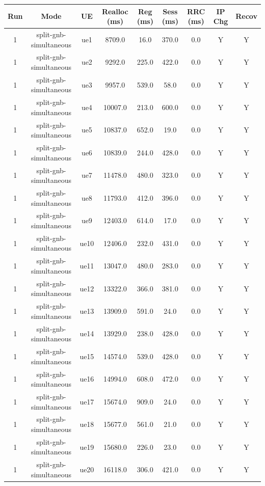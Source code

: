 \begin{table}[ht]
\centering
\begin{tabular}{|c|c|c|c|c|c|c|c|c|}
\hline
Run & Mode & UE & Realloc (ms) & Reg (ms) & Sess (ms) & RRC (ms) & IP Chg & Recov \\
\hline
1 & split-gnb-simultaneous & ue1 & 8709.0 & 16.0 & 370.0 & 0.0 & Y & Y \\
1 & split-gnb-simultaneous & ue2 & 9292.0 & 225.0 & 422.0 & 0.0 & Y & Y \\
1 & split-gnb-simultaneous & ue3 & 9957.0 & 539.0 & 58.0 & 0.0 & Y & Y \\
1 & split-gnb-simultaneous & ue4 & 10007.0 & 213.0 & 600.0 & 0.0 & Y & Y \\
1 & split-gnb-simultaneous & ue5 & 10837.0 & 652.0 & 19.0 & 0.0 & Y & Y \\
1 & split-gnb-simultaneous & ue6 & 10839.0 & 244.0 & 428.0 & 0.0 & Y & Y \\
1 & split-gnb-simultaneous & ue7 & 11478.0 & 480.0 & 323.0 & 0.0 & Y & Y \\
1 & split-gnb-simultaneous & ue8 & 11793.0 & 412.0 & 396.0 & 0.0 & Y & Y \\
1 & split-gnb-simultaneous & ue9 & 12403.0 & 614.0 & 17.0 & 0.0 & Y & Y \\
1 & split-gnb-simultaneous & ue10 & 12406.0 & 232.0 & 431.0 & 0.0 & Y & Y \\
1 & split-gnb-simultaneous & ue11 & 13047.0 & 480.0 & 283.0 & 0.0 & Y & Y \\
1 & split-gnb-simultaneous & ue12 & 13322.0 & 366.0 & 381.0 & 0.0 & Y & Y \\
1 & split-gnb-simultaneous & ue13 & 13909.0 & 591.0 & 24.0 & 0.0 & Y & Y \\
1 & split-gnb-simultaneous & ue14 & 13929.0 & 238.0 & 428.0 & 0.0 & Y & Y \\
1 & split-gnb-simultaneous & ue15 & 14574.0 & 539.0 & 428.0 & 0.0 & Y & Y \\
1 & split-gnb-simultaneous & ue16 & 14994.0 & 608.0 & 472.0 & 0.0 & Y & Y \\
1 & split-gnb-simultaneous & ue17 & 15674.0 & 909.0 & 24.0 & 0.0 & Y & Y \\
1 & split-gnb-simultaneous & ue18 & 15677.0 & 561.0 & 21.0 & 0.0 & Y & Y \\
1 & split-gnb-simultaneous & ue19 & 15680.0 & 226.0 & 23.0 & 0.0 & Y & Y \\
1 & split-gnb-simultaneous & ue20 & 16118.0 & 306.0 & 421.0 & 0.0 & Y & Y \\

\end{tabular}
\end{table}
